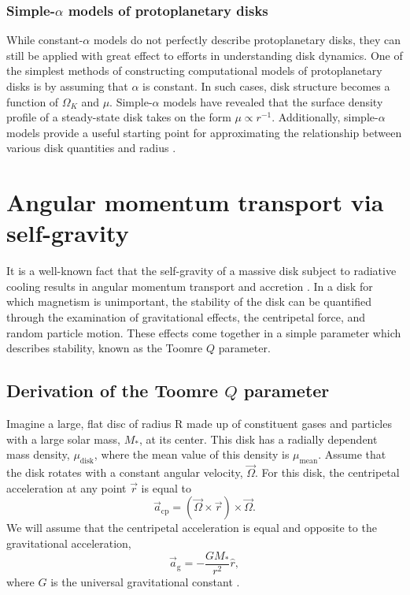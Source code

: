 \documentclass[aps,pra, twocolumn]{revtex4-1}
\begin{document}
\subsubsection{\label{section 2.3.1} Simple-$\alpha$ models of protoplanetary disks}
While constant-$\alpha$ models do not perfectly describe protoplanetary disks, they can still be applied with great effect to efforts in understanding disk dynamics.  One of the simplest methods of constructing computational models of protoplanetary disks is by assuming that $\alpha$ is constant.  In such cases, disk structure becomes a function of $\Omega_K$ and $\mu$.  Simple-$\alpha$ models have revealed that the surface density profile of a steady-state disk takes on the form $\mu \propto r^{-1}$.  Additionally, simple-$\alpha$ models provide a useful starting point for approximating the relationship between various disk quantities and radius \cite{armitage2011}.  




\section{\label{section 3} Angular momentum transport via self-gravity}
It is a well-known fact that the self-gravity of a massive disk subject to radiative cooling results in angular momentum transport and accretion \cite{armitage2011}.  In a disk for which magnetism is unimportant, the stability of the disk can be quantified through the examination of gravitational effects, the centripetal force, and random particle motion.  These effects come together in a simple parameter which describes stability, known as the Toomre $Q$ parameter.



\subsection{\label{section 3.1} Derivation of the Toomre $Q$ parameter}
Imagine a large, flat disc of radius R made up of constituent gases and particles with a large solar mass, $M_*$, at its center.  This disk has a radially dependent mass density, $\mu_\text{disk}$, where the mean value of this density is $\mu_{\text{mean}}$. Assume that the disk rotates with a constant angular velocity, $\vec{\Omega}$. For this disk, the centripetal acceleration at any point $\vec{r}$ is equal to 
\begin{equation}
\vec{a}_{\text{cp}} = \left( \vec{\Omega} \times \vec{r} \right) \times \vec{\Omega} .
\end{equation}
We will assume that the centripetal acceleration is equal and opposite to the gravitational acceleration,
\begin{equation}
\vec{a}_{\text{g}} = -\frac{G M_*}{r^2}\hat{r}, 
\end{equation}
where $G$ is the universal gravitational constant \cite{taylor2005}.
\end{document}
